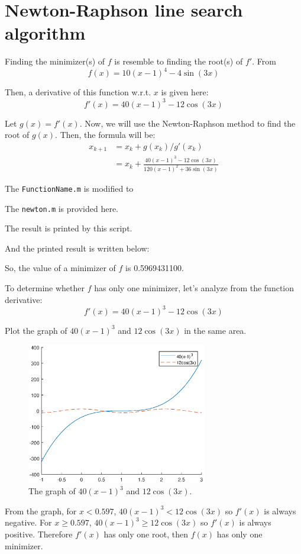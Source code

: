 \documentclass{article}
\begin{document}
\section*{Newton-Raphson line search algorithm}

Finding the minimizer(s) of $f$ is resemble to finding the root(s) of $f'$. From 
$$f(x) = 10(x-1)^4 - 4\sin(3x)$$

Then, a derivative of this function w.r.t. $x$ is given here:
$$f'(x) = 40(x-1)^3 - 12\cos(3x)$$

Let $g(x) = f'(x)$. Now, we will use the Newton-Raphson method to find the root of $g(x)$. Then, the formula will be:
\begin{align*}
    x_{k+1} &= x_k + g(x_k)/g'(x_k) \\
        &= x_k + \frac{40(x-1)^3 - 12\cos(3x)}{120(x-1)^2 + 36\sin(3x)}
\end{align*}

The \lstinline{FunctionName.m} is modified to



The \lstinline{newton.m} is provided here.



The result is printed by this script.



And the printed result is written below:



So, the value of a minimizer of $f$ is 0.5969431100.

To determine whether $f$ has only one minimizer, let's analyze from the function derivative: 
$$f'(x) = 40(x-1)^3 - 12\cos(3x)$$

Plot the graph of $40(x-1)^3$ and $12\cos(3x)$ in the same area.

\begin{figure}[h]
    \centering
    \includegraphics[width = 0.7\textwidth]{plot.eps}
    \caption{The graph of $40(x-1)^3$ and $12\cos(3x)$.}
\end{figure}

From the graph, for $x < 0.597$, $40(x-1)^3 < 12\cos(3x)$ so $f'(x)$ is always negative. For $x \geq 0.597$, $40(x-1)^3 \geq 12\cos(3x)$ so $f'(x)$ is always positive. Therefore $f'(x)$ has only one root, then $f(x)$ has only one minimizer.
\end{document}
